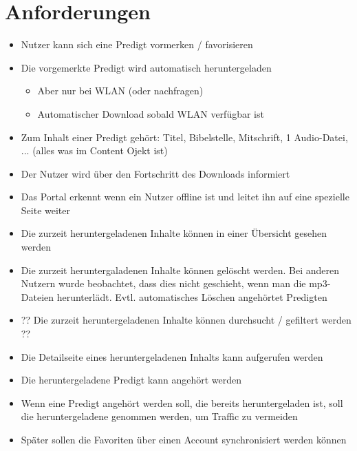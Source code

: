 \section{Anforderungen}
\begin{itemize}
	\item Nutzer kann sich eine Predigt vormerken / favorisieren
	\item Die vorgemerkte Predigt wird automatisch heruntergeladen
	
	\begin{itemize}
		\item Aber nur bei WLAN (oder nachfragen)
		\item Automatischer Download sobald WLAN verfügbar ist
	\end{itemize}

	\item Zum Inhalt einer Predigt gehört: Titel, Bibelstelle, Mitschrift, 1 Audio-Datei, ... (alles was im Content Ojekt ist)
	\item Der Nutzer wird über den Fortschritt des Downloads informiert
	\item Das Portal erkennt wenn ein Nutzer offline ist und leitet ihn auf eine spezielle Seite weiter
	\item Die zurzeit heruntergeladenen Inhalte können in einer Übersicht gesehen werden
 	\item Die zurzeit heruntergaladenen Inhalte können gelöscht werden. Bei anderen Nutzern wurde beobachtet, dass dies nicht geschieht, wenn man die mp3-Dateien herunterlädt. Evtl. automatisches Löschen angehörtet Predigten
	\item ?? Die zurzeit heruntergeladenen Inhalte können durchsucht / gefiltert werden ??
	\item Die Detailseite eines heruntergeladenen Inhalts kann aufgerufen werden 
	\item Die heruntergeladene Predigt kann angehört werden
	\item Wenn eine Predigt angehört werden soll, die bereits heruntergeladen ist, soll die heruntergeladene genommen werden, um Traffic zu vermeiden
	\item Später sollen die Favoriten über einen Account synchronisiert werden können	
\end{itemize}

